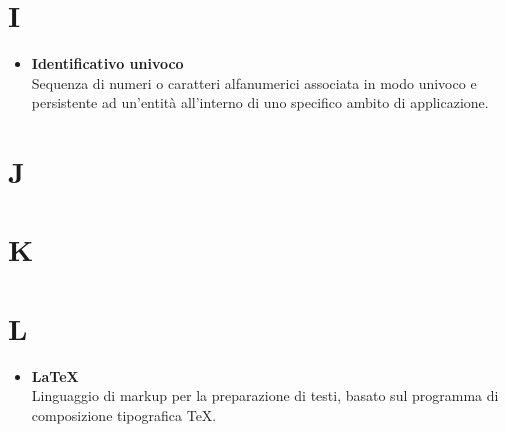 \documentclass[a4paper,12pt]{article}
\begin{document}
        \section*{I} {
            \begin{itemize}
                \item \textbf{Identificativo univoco}\\
                    Sequenza di numeri o caratteri alfanumerici associata in modo univoco e persistente ad un'entità all'interno di uno specifico ambito di applicazione. 
            \end{itemize}            
        }
        \newpage

        \section*{J} {
            
        }
        \newpage

        \section*{K} {
            
        }
        \newpage

        \section*{L} {
            \begin{itemize}
                \item \textbf{LaTeX}\\
                    Linguaggio di markup per la preparazione di testi, basato sul programma di composizione tipografica TeX.
            \end{itemize}
        }
        \newpage
\end{document}
